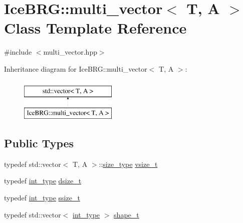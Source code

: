 \hypertarget{classIceBRG_1_1multi__vector}{}\section{Ice\+B\+R\+G\+:\+:multi\+\_\+vector$<$ T, A $>$ Class Template Reference}
\label{classIceBRG_1_1multi__vector}


{\ttfamily \#include $<$multi\+\_\+vector.\+hpp$>$}

Inheritance diagram for Ice\+B\+R\+G\+:\+:multi\+\_\+vector$<$ T, A $>$\+:\begin{figure}[H]
\begin{center}
\leavevmode
\includegraphics[height=2.000000cm]{classIceBRG_1_1multi__vector}
\end{center}
\end{figure}
\subsection*{Public Types}
\begin{DoxyCompactItemize}
\item 
typedef std\+::vector$<$ T, A $>$\+::\hyperlink{lib_2IceBRG__main_2common_8h_a566c61f2ca17211f4ba8557f3f65e8d3}{size\+\_\+type} \hyperlink{classIceBRG_1_1multi__vector_abcc3d84f2afbb3e4239cea8c2c4923c3}{vsize\+\_\+t}
\item 
typedef \hyperlink{lib_2IceBRG__main_2common_8h_ac4de9d9335536ac22821171deec8d39e}{int\+\_\+type} \hyperlink{classIceBRG_1_1multi__vector_af2666369daa5e69abfbadbe365c200e9}{dsize\+\_\+t}
\item 
typedef \hyperlink{lib_2IceBRG__main_2common_8h_ac4de9d9335536ac22821171deec8d39e}{int\+\_\+type} \hyperlink{classIceBRG_1_1multi__vector_a9ad43f84f33367955b45ca260ea5882b}{ssize\+\_\+t}
\item 
typedef std\+::vector$<$ \hyperlink{lib_2IceBRG__main_2common_8h_ac4de9d9335536ac22821171deec8d39e}{int\+\_\+type} $>$ \hyperlink{classIceBRG_1_1multi__vector_a468a7f934274e7aa75e01c94ac58f3ea}{shape\+\_\+t}
\end{DoxyCompactItemize}
